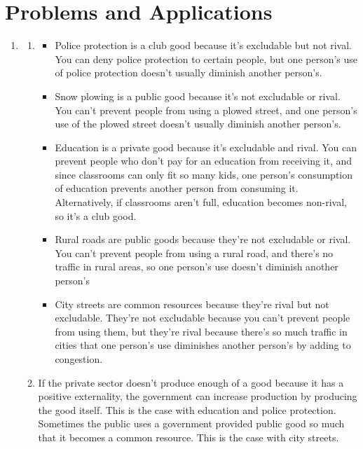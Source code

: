 \documentclass{article}
\begin{document}
\section*{Problems and Applications}

\begin{enumerate}

\item

	\begin{enumerate}
	
	\item
	
		\begin{itemize}
		
		\item Police protection is a club good because it’s excludable but not rival. You can deny police protection to certain people, but one person’s use of police protection doesn’t usually diminish another person’s. 
		
		\item Snow plowing is a public good because it’s not excludable or rival. You can’t prevent people from using a plowed street, and one person’s use of the plowed street doesn’t usually diminish another person’s.
		
		\item Education is a private good because it’s excludable and rival. You can prevent people who don’t pay for an education from receiving it, and since classrooms can only fit so many kids, one person’s consumption of education prevents another person from consuming it. Alternatively, if classrooms aren't full, education becomes non-rival, so it's a club good.
		
		\item Rural roads are public goods because they’re not excludable or rival. You can’t prevent people from using a rural road, and there’s no traffic in rural areas, so one person’s use doesn’t diminish another person’s
		
		\item City streets are common resources because they’re rival but not excludable. They’re not excludable because you can’t prevent people from using them, but they’re rival because there’s so much traffic in cities that one person’s use diminishes another person’s by adding to congestion.
		
		\end{itemize}
	
	\item If the private sector doesn’t produce enough of a good because it has a positive externality, the government can increase production by producing the good itself. This is the case with education and police protection. Sometimes the public uses a government provided public good so much that it becomes a common resource. This is the case with city streets.
	

\end{enumerate}
\end{enumerate}
\end{document}
